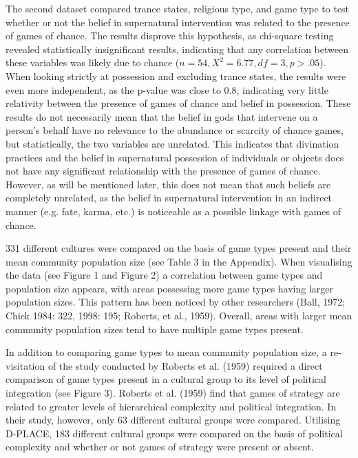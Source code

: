 \documentclass[%
	]{ijsra}
\begin{document}


The second dataset compared trance states, religious type, and game type to test whether or not the belief in supernatural intervention was related to the presence of games of chance. The results disprove this hypothesis, as chi-square testing revealed statistically insignificant results, indicating that any correlation between these variables was likely due to chance ($n = 54, Χ^{2} = 6.77, df = 3, p > .05$).  When looking strictly at possession and excluding trance states, the results were even more independent, as the p-value was close to 0.8, indicating very little relativity between the presence of games of chance and belief in possession. These results do not necessarily mean that the belief in gods that intervene on a person’s behalf have no relevance to the abundance or scarcity of chance games, but statistically, the two variables are unrelated. This indicates that divination practices and the belief in supernatural possession of individuals or objects does not have any significant relationship with the presence of games of chance. However, as will be mentioned later, this does not mean that such beliefs are completely unrelated, as the belief in supernatural intervention in an indirect manner (e.g. fate, karma, etc.) is noticeable as a possible linkage with games of chance.


331 different cultures were compared on the basis of game types present and their mean community population size (see Table 3 in the Appendix).%
 When visualising the data (see Figure 1 and Figure 2) a correlation between game types and population size appears, with areas possessing more game types having larger population sizes. This pattern has been noticed by other researchers (Ball, 1972; Chick 1984: 322, 1998: 195; Roberts, et al., 1959). Overall, areas with larger mean community population sizes tend to have multiple game types present.



In addition to comparing game types to mean community population size, a re-visitation of the study conducted by Roberts et al. (1959) required a direct comparison of game types present in a cultural group to its level of political integration (see Figure 3). Roberts et al. (1959) find that games of strategy are related to greater levels of hierarchical complexity and political integration. In their study, however, only 63 different cultural groups were compared. Utilising D-PLACE, 183 different cultural groups were compared on the basis of political complexity and whether or not games of strategy were present or absent.
\end{document}
